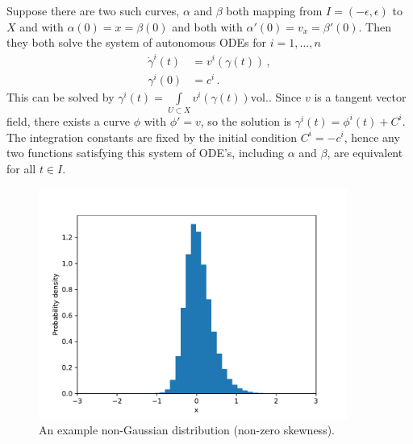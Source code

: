 Suppose there are two such curves, $\alpha$ and $\beta$ both mapping from $I=(-\epsilon,\epsilon)$ to $X$ and with $\alpha(0) = x = \beta(0)$ and both with $\alpha'(0) = v_x = \beta'(0)$. Then they both solve the system of autonomous ODEs for $i=1,\dots,n$
\begin{equation}
\begin{split}
	\dot{\gamma}^i(t) &= v^i(\gamma(t)) \,,\\
	\gamma^i(0) &= c^i\,.
\end{split}
\end{equation}
This can be solved by $\gamma^i(t) = \int\limits_{U\subset X}v^i(\gamma(t))\text{vol.}$. Since $v$ is a tangent vector field, there exists a curve $\phi$ with $\phi' = v$, so the solution is $\gamma^i(t) = \phi^i(t)+C^i$. The integration constants are fixed by the initial condition $C^i=-c^i$, hence any two functions satisfying this system of ODE's, including $\alpha$ and $\beta$, are equivalent for all $t\in I$.
\begin{figure}[ht]
	\centering
	\includegraphics[width=0.9\textwidth]{plots/non_gauss.pdf}
	\caption{An example non-Gaussian distribution (non-zero skewness).}
	\label{fig:non-gauss}
\end{figure}
